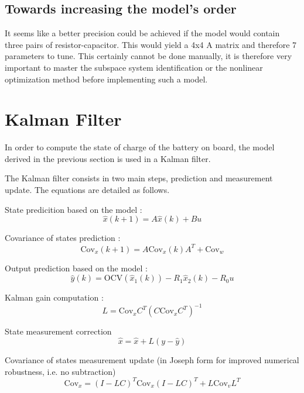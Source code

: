 \documentclass{article}
\begin{document}
\subsection{Towards increasing the model's order}

It seems like a better precision could be achieved if the model would contain three pairs of resistor-capacitor. This would yield a 4x4 A matrix and therefore 7 parameters to tune. This certainly cannot be done manually, it is therefore very important to master the subspace system identification or the nonlinear optimization method before implementing such a model.

\section{Kalman Filter}
In order to compute the state of charge of the battery on board, the model derived in the previous section is used in a Kalman filter. 

The Kalman filter consists in two main steps, prediction and measurement update. The equations are detailed as follows. 

State predicition based on the model : 
\begin{equation}
\hat{x}(k+1) = A\hat{x}(k) + Bu 
\label{eq:1a} 
\end{equation}

Covariance of states prediction :
\begin{equation}
\text{Cov}_x (k+1) = A\text{Cov}_x(k)A^T + \text{Cov}_w  
\label{eq:1b}
\end{equation}

Output prediction based on the model :
\begin{equation}
\hat{y}(k) = \text{OCV}(\hat{x}_1(k)) - R_1 \hat{x}_2(k) - R_0u
\label{eq:1c}
\end{equation}

Kalman gain computation :
\begin{equation}
L = \text{Cov}_x C^T (C \text{Cov}_x C^T)^{-1}
\label{eq:2a}
\end{equation}

State measurement correction
\begin{equation}
\hat{x} = \hat{x} + L(y-\hat{y})
\label{eq:2b}
\end{equation}

Covariance of states measurement update (in Joseph form for improved numerical robustness, i.e. no subtraction)
\begin{equation}
\text{Cov}_x = (I-LC)^T \text{Cov}_x (I-LC)^T + L \text{Cov}_v L^T
\label{eq:2c}
\end{equation}
\end{document}
